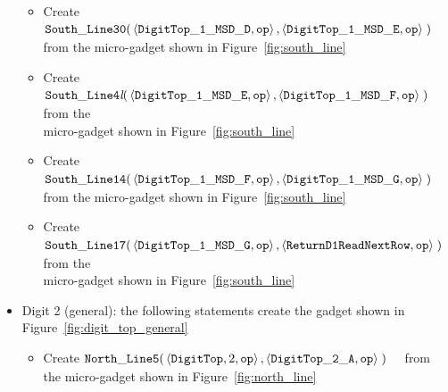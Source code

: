 \begin{itemize}
\begin{itemize}
            \item Create
            $\begin{aligned}[t]
                {\tt South\_Line30}(& \left\langle {\tt DigitTop\_1\_MSD\_D}, {\tt op} \right\rangle,
                                      \left\langle {\tt DigitTop\_1\_MSD\_E}, {\tt op} \right\rangle \;)
            \end{aligned}$ from the micro-gadget shown in Figure~\ref{fig:south_line}

            \item Create
            $\begin{aligned}[t]
                {\tt South\_Line4\textit{l}}(& \left\langle {\tt DigitTop\_1\_MSD\_E}, {\tt op} \right\rangle,
                                               \left\langle {\tt DigitTop\_1\_MSD\_F}, {\tt op} \right\rangle \;)
            \end{aligned}$ from the\\micro-gadget shown in Figure~\ref{fig:south_line}

            \item Create
            $\begin{aligned}[t]
                {\tt South\_Line14}(& \left\langle {\tt DigitTop\_1\_MSD\_F}, {\tt op} \right\rangle,
                                      \left\langle {\tt DigitTop\_1\_MSD\_G}, {\tt op} \right\rangle \;)
            \end{aligned}$ from the micro-gadget shown in Figure~\ref{fig:south_line}

            \item Create
            $\begin{aligned}[t]
                {\tt South\_Line17}(& \left\langle {\tt DigitTop\_1\_MSD\_G}, {\tt op} \right\rangle,
                                      \left\langle {\tt ReturnD1ReadNextRow}, {\tt op} \right\rangle \;)
            \end{aligned}$ from the\\micro-gadget shown in Figure~\ref{fig:south_line}
        \end{itemize}
        \vspace{1cm}


        \item Digit 2 (general): the following statements create the gadget shown in Figure~\ref{fig:digit_top_general}
        \begin{itemize}
            \item Create
            $\begin{aligned}[t]
                {\tt North\_Line5}(& \left\langle {\tt DigitTop}, 2,    {\tt op} \right\rangle,
                                     \left\langle {\tt DigitTop\_2\_A}, {\tt op} \right\rangle \;)
            \end{aligned}$ from the micro-gadget shown in Figure~\ref{fig:north_line}


\end{itemize}
\end{itemize}

